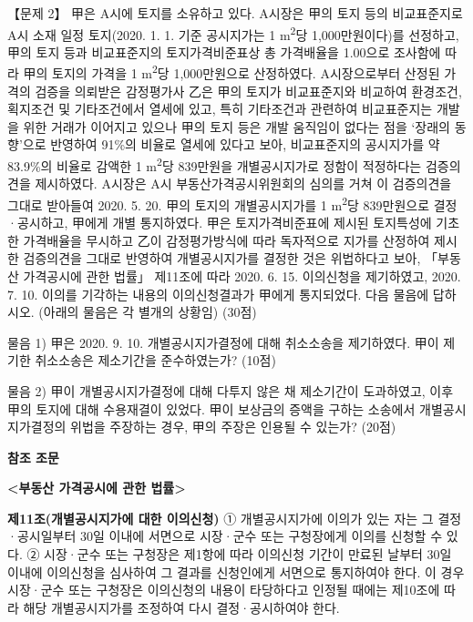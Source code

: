 \begin{longquestion}{【문제 2】}
甲은 A시에 토지를 소유하고 있다. A시장은 甲의 토지 등의 비교표준지로 A시 소재 일정 토지(2020. 1. 1. 기준 공시지가는 1 m\textsuperscript{2}당 1,000만원이다)를 선정하고, 甲의 토지 등과 비교표준지의 토지가격비준표상 총 가격배율을 1.00으로 조사함에 따라 甲의 토지의 가격을 1 m\textsuperscript{2}당 1,000만원으로 산정하였다. A시장으로부터 산정된 가격의 검증을 의뢰받은 감정평가사 乙은 甲의 토지가 비교표준지와 비교하여 환경조건, 획지조건 및 기타조건에서 열세에 있고, 특히 기타조건과 관련하여 비교표준지는 개발을 위한 거래가 이어지고 있으나 甲의 토지 등은 개발 움직임이 없다는 점을 ‘장래의 동향’으로 반영하여 91\%의 비율로 열세에 있다고 보아, 비교표준지의 공시지가를 약 83.9\%의 비율로 감액한 1 m\textsuperscript{2}당 839만원을 개별공시지가로 정함이 적정하다는 검증의견을 제시하였다. A시장은 A시 부동산가격공시위원회의 심의를 거쳐 이 검증의견을 그대로 받아들여 2020. 5. 20. 甲의 토지의 개별공시지가를 1 m\textsuperscript{2}당 839만원으로 결정·공시하고, 甲에게 개별 통지하였다. 甲은 토지가격비준표에 제시된 토지특성에 기초한 가격배율을 무시하고 乙이 감정평가방식에 따라 독자적으로 지가를 산정하여 제시한 검증의견을 그대로 반영하여 개별공시지가를 결정한 것은 위법하다고 보아, 「부동산 가격공시에 관한 법률」 제11조에 따라 2020. 6. 15. 이의신청을 제기하였고, 2020. 7. 10. 이의를 기각하는 내용의 이의신청결과가 甲에게 통지되었다. 다음 물음에 답하시오. (아래의 물음은 각 별개의 상황임) (30점) \par
\medskip\noindent 물음 1) 甲은 2020. 9. 10. 개별공시지가결정에 대해 취소소송을 제기하였다. 甲이 제기한 취소소송은 제소기간을 준수하였는가? (10점) \par
\medskip\noindent 물음 2) 甲이 개별공시지가결정에 대해 다투지 않은 채 제소기간이 도과하였고, 이후 甲의 토지에 대해 수용재결이 있었다. 甲이 보상금의 증액을 구하는 소송에서 개별공시지가결정의 위법을 주장하는 경우, 甲의 주장은 인용될 수 있는가? (20점) \par
\medskip
\begin{framedtext}
\textbf{참조 조문} \par
\textbf{<부동산 가격공시에 관한 법률>} \par
\textbf{제11조(개별공시지가에 대한 이의신청)} ① 개별공시지가에 이의가 있는 자는 그 결정·공시일부터 30일 이내에 서면으로 시장·군수 또는 구청장에게 이의를 신청할 수 있다. ② 시장·군수 또는 구청장은 제1항에 따라 이의신청 기간이 만료된 날부터 30일 이내에 이의신청을 심사하여 그 결과를 신청인에게 서면으로 통지하여야 한다. 이 경우 시장·군수 또는 구청장은 이의신청의 내용이 타당하다고 인정될 때에는 제10조에 따라 해당 개별공시지가를 조정하여 다시 결정·공시하여야 한다. \par

\end{framedtext}
\end{longquestion}
